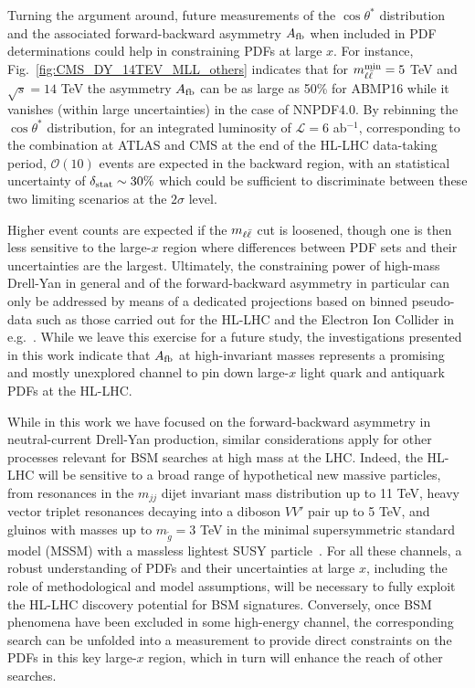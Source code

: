 Turning the argument around, future measurements of the $\cos\theta^*$
distribution and the associated forward-backward asymmetry 
$A_{\rm fb}$ when included in PDF determinations could help in
constraining PDFs at large $x$.
%
For instance, Fig.~\ref{fig:CMS_DY_14TEV_MLL_others} indicates that for
$m_{\ell\bar{\ell}}^{\rm min}=5$ TeV and $\sqrt{s}=14$ TeV the
asymmetry $A_{\rm fb}$ can be as large as 50\% for ABMP16
while it vanishes (within large uncertainties) in the case of NNPDF4.0.
%
By rebinning the $\cos\theta^*$ distribution, for an integrated
luminosity of $\mathcal{L}=6$ ab$^{-1}$, corresponding to the
combination at ATLAS and CMS 
at the end of the HL-LHC data-taking period, $\mathcal{O}(10)$ events are expected in the backward region,
with an statistical uncertainty of $\delta_{\rm stat}\sim 30\%$ which could be sufficient to
discriminate between these two limiting scenarios at the $2\sigma$ level.

Higher event counts are expected if the $m_{\ell\bar{\ell}}$ cut is loosened, though one is
then less sensitive to the large-$x$ region where differences between PDF sets and their
uncertainties are the largest.
%
Ultimately, the constraining power of high-mass Drell-Yan in general and of the forward-backward
asymmetry in particular can only be addressed by means of a dedicated projections
based on binned pseudo-data such as those carried
out for the HL-LHC and the Electron Ion Collider in e.g.~\cite{AbdulKhalek:2018rok,Khalek:2021ulf}.
%
While we leave this exercise for a future study, the investigations
presented in this work indicate that $A_{\rm fb}$
at high-invariant masses represents a promising and mostly
unexplored channel to pin down large-$x$ light
quark and antiquark PDFs at the HL-LHC.

While in this work
we have focused on the forward-backward asymmetry in neutral-current Drell-Yan production,
similar considerations apply for other processes relevant
for BSM searches at high mass at the LHC.
%
Indeed, the HL-LHC will be sensitive to a broad range of hypothetical
new massive particles, from resonances in the $m_{jj}$ dijet invariant mass distribution up to 11 TeV,
heavy vector triplet resonances decaying into a diboson $VV'$ pair up to 5 TeV,
and gluinos with masses up to $m_{\tilde{g}}=3$ TeV in the minimal
supersymmetric standard model (MSSM) with a massless lightest SUSY
particle~\cite{CidVidal:2018eel}.
%
For all these channels, a robust understanding of PDFs
and their uncertainties at large $x$, including the role of
methodological and model assumptions, will be necessary to fully exploit
the HL-LHC discovery potential for BSM signatures.
%
%
Conversely, once BSM phenomena have been excluded in some high-energy channel,
the corresponding search can be unfolded into a measurement to provide direct
constraints on the PDFs in this key large-$x$ region, which in turn will
enhance the reach of other searches.

